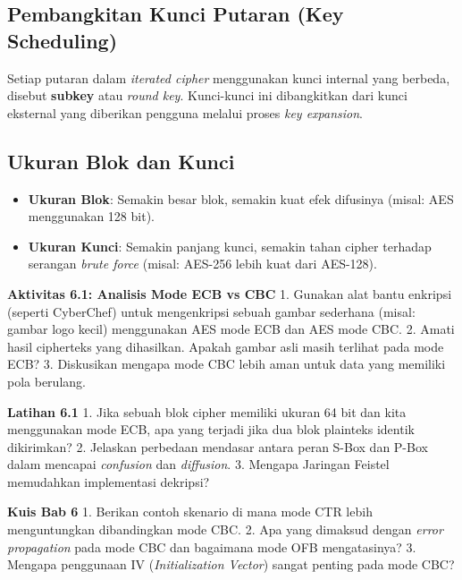 \documentclass[../main.tex]{subfiles}
\begin{document}
\subsection{Pembangkitan Kunci Putaran (Key Scheduling)}
Setiap putaran dalam \textit{iterated cipher} menggunakan kunci internal yang berbeda, disebut \textbf{subkey} atau \textit{round key}. Kunci-kunci ini dibangkitkan dari kunci eksternal yang diberikan pengguna melalui proses \textit{key expansion}.

\subsection{Ukuran Blok dan Kunci}
\begin{itemize}
    \item \textbf{Ukuran Blok}: Semakin besar blok, semakin kuat efek difusinya (misal: AES menggunakan 128 bit).
    \item \textbf{Ukuran Kunci}: Semakin panjang kunci, semakin tahan cipher terhadap serangan \textit{brute force} (misal: AES-256 lebih kuat dari AES-128).
\end{itemize}

\begin{obeactivity}
\textbf{Aktivitas 6.1: Analisis Mode ECB vs CBC}
1. Gunakan alat bantu enkripsi (seperti CyberChef) untuk mengenkripsi sebuah gambar sederhana (misal: gambar logo kecil) menggunakan AES mode ECB dan AES mode CBC.
2. Amati hasil cipherteks yang dihasilkan. Apakah gambar asli masih terlihat pada mode ECB?
3. Diskusikan mengapa mode CBC lebih aman untuk data yang memiliki pola berulang.
\end{obeactivity}

\begin{obereflection}
\textbf{Latihan 6.1}
1. Jika sebuah blok cipher memiliki ukuran 64 bit dan kita menggunakan mode ECB, apa yang terjadi jika dua blok plainteks identik dikirimkan?
2. Jelaskan perbedaan mendasar antara peran S-Box dan P-Box dalam mencapai \textit{confusion} dan \textit{diffusion}.
3. Mengapa Jaringan Feistel memudahkan implementasi dekripsi?
\end{obereflection}

\begin{obeassessment}
\textbf{Kuis Bab 6}
1. Berikan contoh skenario di mana mode CTR lebih menguntungkan dibandingkan mode CBC.
2. Apa yang dimaksud dengan \textit{error propagation} pada mode CBC dan bagaimana mode OFB mengatasinya?
3. Mengapa penggunaan IV (\textit{Initialization Vector}) sangat penting pada mode CBC?
\end{obeassessment}
\end{document}
